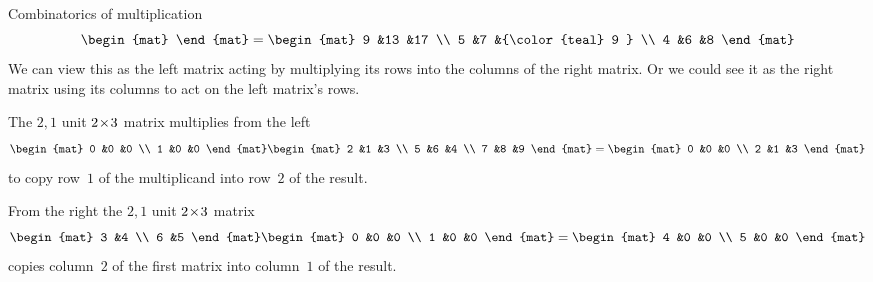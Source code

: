 \documentclass[10pt,t]{beamer}
\begin{document}
\begin{frame}{Combinatorics of multiplication}
\begin{equation*}
\begin{mat}
    \end{mat}
  =
    \begin{mat}
      9  &13   &17                           \\
      5  &7    &{\color{teal} 9 }   \\  
      4  &6    &8
    \end{mat}
\end{equation*}
We can view this as the left matrix acting
by multiplying its rows into the columns of the right matrix.
Or we could see it as 
the right matrix using its columns to
act on the left matrix's rows.
\end{frame}




\begin{frame}
\df[df:UnitMatrix]
\ex
The $2,1$ unit $2 \! \times \! 3$ matrix multiplies from the left 
\begin{equation*}
  \begin{mat}
    0 &0 &0 \\
    1 &0 &0
  \end{mat}
  \begin{mat}
    2 &1 &3 \\
    5 &6 &4 \\
    7 &8 &9
  \end{mat}
  =
  \begin{mat}
    0 &0 &0 \\
    2 &1 &3 
  \end{mat}
\end{equation*}
to copy row~$1$ of the multiplicand into row~$2$ of the result. 

\pause
\ex 
From the right the $2,1$ unit $2 \! \times \! 3$ matrix
\begin{equation*}
  \begin{mat}
    3 &4 \\
    6 &5
  \end{mat}
  \begin{mat}
    0 &0 &0 \\
    1 &0 &0
  \end{mat}
  =
  \begin{mat}
    4 &0 &0 \\
    5 &0 &0
  \end{mat}
\end{equation*}
copies column~$2$ of the first matrix into column~$1$ of the result.


\end{frame}
\end{document}
